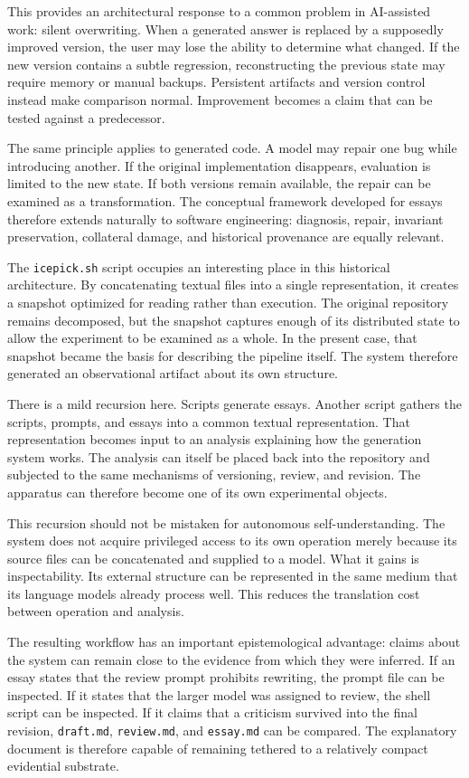 \documentclass[11pt]{article}
\begin{document}
This provides an architectural response to a common problem in AI-assisted work: silent overwriting. When a generated answer is replaced by a supposedly improved version, the user may lose the ability to determine what changed. If the new version contains a subtle regression, reconstructing the previous state may require memory or manual backups. Persistent artifacts and version control instead make comparison normal. Improvement becomes a claim that can be tested against a predecessor.

The same principle applies to generated code. A model may repair one bug while introducing another. If the original implementation disappears, evaluation is limited to the new state. If both versions remain available, the repair can be examined as a transformation. The conceptual framework developed for essays therefore extends naturally to software engineering: diagnosis, repair, invariant preservation, collateral damage, and historical provenance are equally relevant.

The \texttt{icepick.sh} script occupies an interesting place in this historical architecture. By concatenating textual files into a single representation, it creates a snapshot optimized for reading rather than execution. The original repository remains decomposed, but the snapshot captures enough of its distributed state to allow the experiment to be examined as a whole. In the present case, that snapshot became the basis for describing the pipeline itself. The system therefore generated an observational artifact about its own structure.

There is a mild recursion here. Scripts generate essays. Another script gathers the scripts, prompts, and essays into a common textual representation. That representation becomes input to an analysis explaining how the generation system works. The analysis can itself be placed back into the repository and subjected to the same mechanisms of versioning, review, and revision. The apparatus can therefore become one of its own experimental objects.

This recursion should not be mistaken for autonomous self-understanding. The system does not acquire privileged access to its own operation merely because its source files can be concatenated and supplied to a model. What it gains is inspectability. Its external structure can be represented in the same medium that its language models already process well. This reduces the translation cost between operation and analysis.

The resulting workflow has an important epistemological advantage: claims about the system can remain close to the evidence from which they were inferred. If an essay states that the review prompt prohibits rewriting, the prompt file can be inspected. If it states that the larger model was assigned to review, the shell script can be inspected. If it claims that a criticism survived into the final revision, \texttt{draft.md}, \texttt{review.md}, and \texttt{essay.md} can be compared. The explanatory document is therefore capable of remaining tethered to a relatively compact evidential substrate.
\end{document}
